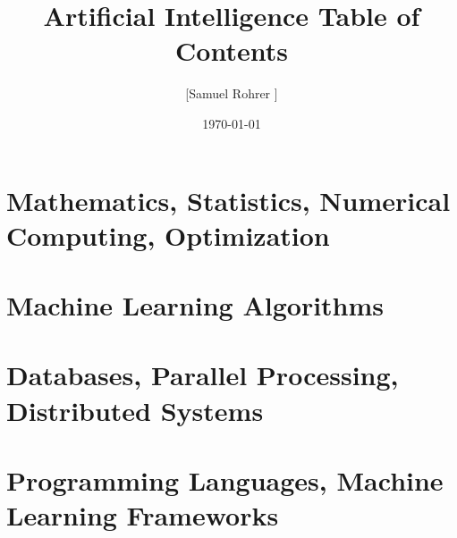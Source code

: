 \documentclass[12pt, oneside]{article}
\title{Artificial Intelligence Table of Contents}
\author{[Samuel Rohrer \textcopyright]}
\date{\today}
\begin{document}
\maketitle
\tableofcontents

\newpage
\section{Mathematics, Statistics, Numerical Computing, Optimization}
\newpage


\newpage
\section{Machine Learning Algorithms}
\newpage


\newpage
\section{Databases, Parallel Processing, Distributed Systems}
\newpage


\newpage
\section{Programming Languages, Machine Learning Frameworks}
\newpage

\end{document}
